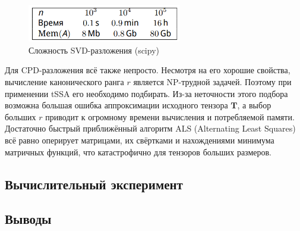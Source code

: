 			 		\begin{figure}[h]
			 			\centering
			 			\caption{Сложность SVD-разложения (scipy)}\label{tab:svd_time}
			 			\includegraphics[width=0.6\textwidth, keepaspectratio]{../figs/svd_time.png}
			 		\end{figure}
			 		
			 		Для CPD-разложения всё также непросто. Несмотря на его хорошие свойства, вычисление канонического ранга $ r $ является NP-трудной задачей. Поэтому при  применении tSSA его необходимо подбирать. Из-за неточности этого подбора возможна большая ошибка аппроксимации исходного тензора $ \mathbf{T} $, а выбор больших $ r $ приводит к огромному времени вычисления и потребляемой памяти. Достаточно быстрый приближённый алгоритм ALS (Alternating Least Squares) всё равно оперирует матрицами, их свёртками и нахождениями минимума матричных функций, что катастрофично для тензоров больших размеров.
			 
			 \subsection*{Вычислительный эксперимент}
			 
			 
			 \subsection*{Выводы}
			
			
		
		\newpage
		\printbibliography
	
